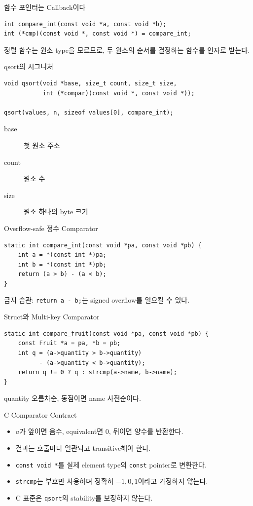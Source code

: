 \begin{frame}[fragile]{함수 포인터는 Callback이다}
\optional[선택 심화]\hfill
\begin{lstlisting}[style=ccode]
int compare_int(const void *a, const void *b);
int (*cmp)(const void *, const void *) = compare_int;
\end{lstlisting}
정렬 함수는 원소 type을 모르므로, 두 원소의 순서를 결정하는 함수를 인자로 받는다.
\end{frame}
\begin{frame}[fragile]{qsort의 시그니처}
\begin{lstlisting}[style=ccode]
void qsort(void *base, size_t count, size_t size,
           int (*compar)(const void *, const void *));

qsort(values, n, sizeof values[0], compare_int);
\end{lstlisting}
\begin{description}\item[base] 첫 원소 주소\item[count] 원소 수\item[size] 원소 하나의 byte 크기\end{description}
\end{frame}
\begin{frame}[fragile]{Overflow-safe 정수 Comparator}
\begin{lstlisting}[style=ccode]
static int compare_int(const void *pa, const void *pb) {
    int a = *(const int *)pa;
    int b = *(const int *)pb;
    return (a > b) - (a < b);
}
\end{lstlisting}
\alert{금지 습관:} \texttt{return a - b;}는 signed overflow를 일으킬 수 있다.
\end{frame}
\begin{frame}[fragile]{Struct와 Multi-key Comparator}
\begin{lstlisting}[style=ccode,basicstyle=\ttfamily\small]
static int compare_fruit(const void *pa, const void *pb) {
    const Fruit *a = pa, *b = pb;
    int q = (a->quantity > b->quantity)
          - (a->quantity < b->quantity);
    return q != 0 ? q : strcmp(a->name, b->name);
}
\end{lstlisting}
quantity 오름차순, 동점이면 name 사전순이다.
\end{frame}
\begin{frame}{C Comparator Contract}
\begin{itemize}\item $a$가 앞이면 음수, equivalent면 0, 뒤이면 양수를 반환한다.\item 결과는 호출마다 일관되고 transitive해야 한다.\item \texttt{const void *}를 실제 element type의 \texttt{const} pointer로 변환한다.\item \texttt{strcmp}는 부호만 사용하며 정확히 $-1,0,1$이라고 가정하지 않는다.\item C 표준은 \texttt{qsort}의 stability를 보장하지 않는다.\end{itemize}
\end{frame}
